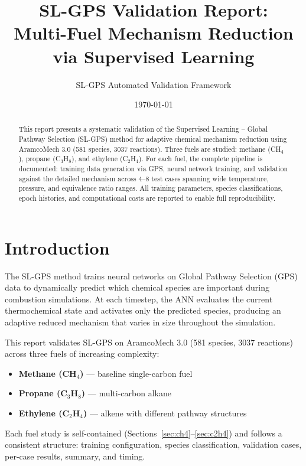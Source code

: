 \documentclass[11pt,a4paper]{article}
\title{SL-GPS Validation Report:\\Multi-Fuel Mechanism Reduction\\via Supervised Learning}
\author{SL-GPS Automated Validation Framework}
\date{\today}
\begin{document}
\maketitle

\begin{abstract}
This report presents a systematic validation of the Supervised Learning -- Global Pathway Selection (SL-GPS) method for adaptive chemical mechanism reduction using AramcoMech 3.0 (581 species, 3037 reactions). Three fuels are studied: methane (CH$_4$), propane (C$_3$H$_8$), and ethylene (C$_2$H$_4$). For each fuel, the complete pipeline is documented: training data generation via GPS, neural network training, and validation against the detailed mechanism across 4--8 test cases spanning wide temperature, pressure, and equivalence ratio ranges. All training parameters, species classifications, epoch histories, and computational costs are reported to enable full reproducibility.
\end{abstract}

\tableofcontents
\newpage

\section{Introduction}

The SL-GPS method trains neural networks on Global Pathway Selection (GPS) data to dynamically predict which chemical species are important during combustion simulations. At each timestep, the ANN evaluates the current thermochemical state and activates only the predicted species, producing an adaptive reduced mechanism that varies in size throughout the simulation.

This report validates SL-GPS on AramcoMech 3.0 \cite{aramco3} (581 species, 3037 reactions) across three fuels of increasing complexity:
\begin{itemize}
    \item \textbf{Methane (CH$_4$)} --- baseline single-carbon fuel
    \item \textbf{Propane (C$_3$H$_8$)} --- multi-carbon alkane
    \item \textbf{Ethylene (C$_2$H$_4$)} --- alkene with different pathway structures
\end{itemize}

Each fuel study is self-contained (Sections~\ref{sec:ch4}--\ref{sec:c2h4}) and follows a consistent structure: training configuration, species classification, validation cases, per-case results, summary, and timing.
\end{document}
